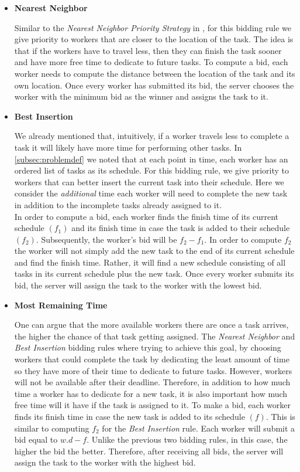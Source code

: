 \begin{itemize}

\item \textbf{Nearest Neighbor}

Similar to the \textit{Nearest Neighbor Priority Strategy} in \cite{Kazemi12}, for this bidding rule we give priority to workers that are closer to the location of the task. The idea is that if the workers have to travel less, then they can finish the task sooner and have more free time to dedicate to future tasks. To compute a bid, each worker needs to compute the distance between the location of the task and its own location. Once every worker has submitted its bid, the server chooses the worker with the minimum bid as the winner and assigns the task to it.

\item \textbf{Best Insertion}

We already mentioned that, intuitively, if a worker travels less to complete a task it will likely have more time for performing other tasks. In \cref{subsec:problemdef} we noted that at each point in time, each worker has an ordered list of tasks as its schedule. For this bidding rule, we give priority to workers that can better insert the current task into their schedule. Here we consider the \textit{additional} time each worker will need to complete the new task in addition to the incomplete tasks already assigned to it.\\
In order to compute a bid, each worker finds the finish time of its current schedule $(f_1)$ and its finish time in case the task is added to their schedule $(f_2)$. Subsequently, the worker's bid will be $f_2 - f_1$. In order to compute $f_2$ the worker will not simply add the new task to the end of its current schedule and find the finish time. Rather, it will find a new schedule consisting of all tasks in its current schedule plus the new task.
Once every worker submits its bid, the server will assign the task to the worker with the lowest bid.

\item \textbf{Most Remaining Time}

One can argue that the more available workers there are once a task arrives, the higher the chance of that task getting assigned. The \textit{Nearest Neighbor} and \textit{Best Insertion} bidding rules where trying to achieve this goal, by choosing workers that could complete the task by dedicating the least amount of time so they have more of their time to dedicate to future tasks. However, workers will not be available after their deadline. Therefore, in addition to how much time a worker has to dedicate for a new task, it is also important how much free time will it have if the task is assigned to it. To make a bid, each worker finds its finish time in case the new task is added to its schedule $(f)$. This is similar to computing $f_2$ for the \textit{Best Insertion} rule. Each worker will submit a bid equal to $w.d - f$. Unlike the previous two bidding rules, in this case, the higher the bid the better. Therefore, after receiving all bids, the server will assign the task to the worker with the highest bid.


\end{itemize}
